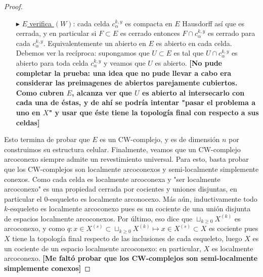 \documentclass[11pt]{article}
\begin{document}
\begin{proof}
\begin{itemize}
y m\'as a\'un de aqu\'i se ve que si $c_\beta^{l,y}$ es cara de $c_\alpha^{k,x}$ entonces $e_\alpha^l$ es cara de  $e_\beta^k$. Entonces, si $c_\beta^{l,y}$ tuviese infinitas caras, tendr\'iamos al menos numerables celdas $\{c_{\alpha_n}^{k_n,y_n}\}_{n \geq 1}$ que son caras de $c_\beta^{l,y}$. Luego las celdas $\{e_{\alpha_n}^{k_n}\}_{n \geq 1}$ ser\'ian caras de $e_\beta^l$ y como $X$ es CW-complejo, deben ser finitas: as\'i, las suceciones $(\alpha_n)_n,(k_n)_n$ toman finitos valores $\gamma_1, \dots, \gamma_s$ y $m_1, \dots, m_r$. Luego, debe existir un par $(\gamma_i,k_j)$ tal que hay infinitas celdas de la forma $c_{\gamma_i}^{k_j,x}$ que son caras de $c_\beta^{l,y}$. \textbf{[Me falt\'o probar que esto \'ultimo es absurdo. Una idea que tuve, pero que no pude conretar, fue intentar ver que algunos de estos puntos formaban un subespacio discreto y usar la compacidad de $c_\alpha^{l,y}$]}
\item[$\blacktriangleright$] \underline{$E$ verifica $(W)$}: cada celda $c_\alpha^{k,y}$ es compacta en $E$ Hausdorff as\'i que es cerrada, y en particular si $F \subset E$ es cerrado entonces $F \cap c_\alpha^{k,y}$ es cerrado para cada $c_\alpha^{k,y}$. Equivalentemente un abierto en $E$ es abierto en cada celda. Debemos ver la rec\'iproca: supongamos que $U \subset E$ es tal que $U \cap c_\alpha^{k,y}$ es abierto para toda celda $c_\alpha^{k,y}$ y veamos que $U$ es abierto. \textbf{[No pude completar la prueba: una idea que no pude llevar a cabo era considerar las preimagenes de abiertos parejamente cubiertos. Como cubren $E$, alcanza ver que $U$ es abierto al intersecarlo con cada una de \'estas, y de ah\'i se podr\'ia intentar "pasar el problema a uno en $X$" y usar que \'este tiene la topolog\'ia final con respecto a sus celdas]}
\end{itemize}
Esto termina de probar que $E$ es un CW-complejo, y es de dimensi\'on $n$ por construimos su estructura celular. Finalmente, veamos que un CW-complejo arcoconexo siempre admite un revestimiento universal. Para esto, basta probar que los CW-complejos son localmente arcoconexos y semi-localmente simplemente conexos. Como cada celda es localmente arcoconexa y "ser localmente arcoconexo" es una propiedad cerrada por cocientes y uniones disjuntas, en particular el $0$-esqueleto es localmente arconocexo. M\'as a\'un, inductivamente todo $k$-esqueleto es localmente arcoconexo pues es un cociente de una uni\'on disjunta de espacios localmente arcoconexos. Por \'ultimo, eso dice que $\sqcup_{k \geq 0}X^{(k)}$ es arcoconexo, y como $q : x \in X^{(s)} \subset \sqcup_{k \geq 0}X^{(k)} \mapsto x \in X^{(s)} \subset X$ es cociente pues $X$ tiene la topolog\'ia final respecto de las inclusiones de cada esqueleto, luego $X$ es un cociente de un espacio localmente arcoconexo: en particular, $X$ es localmente arcoconexo. \textbf{[Me falt\'o probar que los CW-complejos son semi-localmente simplemente conexos]}
\end{proof}
\end{document}
